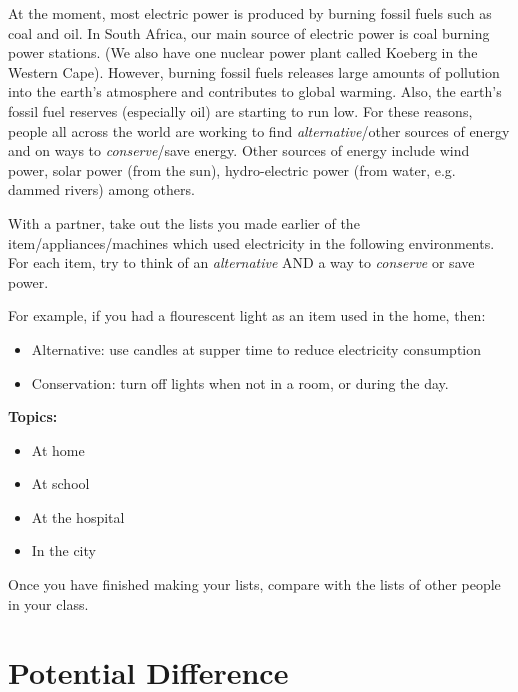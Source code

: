 {
\noindent At the moment, most electric power is produced by burning fossil fuels such as coal and oil. In South Africa, our main
source of electric power is coal burning power stations. (We also have one nuclear power plant called Koeberg in the Western Cape). However, burning fossil fuels releases large amounts of pollution into the earth's atmosphere and contributes
to global warming. Also, the earth's fossil fuel reserves (especially oil) are starting to run low. For these reasons, people all across the world are working to find \textit{alternative}/other sources of energy and on ways to \textit{conserve}/save energy. Other sources of energy include
wind power, solar power (from the sun), hydro-electric power (from water, e.g. dammed rivers) among others. 

\noindent With a partner, take out the lists you made earlier of the item/appliances/machines which used electricity in the following environments. For each item, try to think of an \textit{alternative} AND a way to \textit{conserve} or save power. 

\noindent For example, if you had a flourescent light as an item used in the home, then:
\begin{itemize}
\item Alternative: use candles at supper time to reduce electricity consumption
\item Conservation: turn off lights when not in a room, or during the day.
\end{itemize}


\noindent \textbf{Topics:}
\begin{itemize}
\item At home
\item At school
\item At the hospital
\item In the city
\end{itemize}
 
\noindent Once you have finished making your lists, compare with the lists of other people in your class. 
}










\section{Potential Difference}


